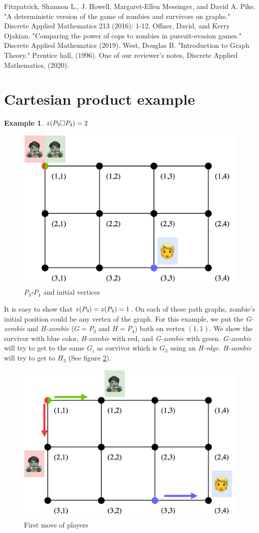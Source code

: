 \documentclass[1p]{elsarticle}
\newtheorem{example}[theorem]{Example}
\newcommand{\zn}{\ooalign{$z$\cr\hfil\rule[.5ex]{.2em}{.08ex}\hfil\cr}}
\begin{document}
\begin{thebibliography}{999}
	
	Fitzpatrick, Shannon L., J. Howell, Margaret-Ellen Messinger, and David A. Pike. "A deterministic version of the
	game of zombies and survivors on graphs." Discrete Applied Mathematics 213 (2016): 1-12.
	Offner, David, and Kerry Ojakian. "Comparing the power of cops to zombies in pursuit-evasion games." Discrete
	Applied Mathematics (2019).
	West, Douglas B. "Introduction to Graph Theory." Prentice hall, (1996).
	One of our reviewer's notes, Discrete Applied Mathematics, (2020).
\end{thebibliography}

\newpage
\appendix
\section{Cartesian product example} \label{cartesianProductExample}
\begin{example} $\zn(P_3 \square P_4 ) = 2$
\end{example}

\begin{figure}[h!]
	\centering
	\includegraphics[width=0.5\linewidth]{fig/p34m1.png}
	\caption{$P_3 \square P_4$ and initial vertices}
	\label{fig:p3}
\end{figure}

It is easy to show that $\zn(P_3) = \zn(P_4) = 1$. On each of these path graphs, zombie's initial position could be any
vertex of the graph. For this example, we put the {\it G-zombie} and {\it H-zombie} ($G = P_3$ and $H = P_4$) both on
vertex $(1,1)$. We show the survivor with blue color, {\it H-zombie} with red, and {\it G-zombie} with green. {\it
G-zombie} will try to get to the same $G_{i}$ as survivor which is $G_3$ using an {\it H-edge}. {\it H-zombie} will try
to get to $H_3$ (See figure \ref{fig:p4}).

\begin{figure}[h!]
	\centering
	\includegraphics[width=0.5\linewidth]{fig/p34m2.png}
	\caption{First move of players}
	\label{fig:p4}
\end{figure}
\end{document}
